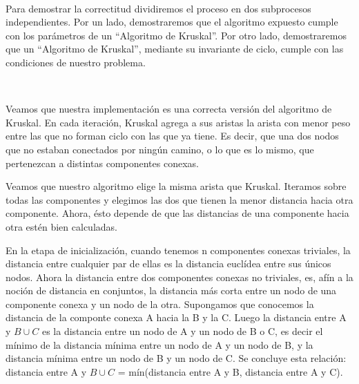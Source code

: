 \documentclass[11pt, a4paper, twoside]{article}
\begin{document}
{}

\begin{paragraph}\

Para demostrar la correctitud dividiremos el proceso en dos subprocesos
independientes. Por un lado, demostraremos que el algoritmo expuesto cumple
con los parámetros de un ``Algoritmo de Kruskal''. Por otro lado,
demostraremos que un ``Algoritmo de Kruskal'', mediante su invariante de
ciclo, cumple con las condiciones de nuestro problema.

\end{paragraph}

\begin{paragraph}\


Veamos que nuestra implementación es una correcta versión del algoritmo de
Kruskal. En cada iteración, Kruskal agrega a sus aristas la arista con menor
peso entre las que no forman ciclo con las que ya tiene. Es decir, que una dos
nodos que no estaban conectados por ningún camino, o lo que es lo mismo, que
pertenezcan a distintas componentes conexas.

Veamos que nuestro algoritmo elige la misma arista que Kruskal. Iteramos sobre
todas las componentes y elegimos las dos que tienen la menor distancia hacia
otra componente. Ahora, ésto depende de que las distancias de una componente hacia otra
estén bien calculadas.

En la etapa de inicialización, cuando tenemos n componentes conexas triviales,
la distancia entre cualquier par de ellas es la distancia euclídea entre sus
únicos nodos. Ahora la distancia entre dos componentes conexas no triviales,
es, afín a la noción de distancia en conjuntos, la distancia más corta entre
un nodo de una componente conexa y un nodo de la otra. Supongamos que
conocemos la distancia de la componte conexa A hacia la B y la C. Luego la
distancia entre A y $B \cup C$ es la distancia entre un nodo de A y un nodo de
B o C, es decir el mínimo de la distancia mínima entre un nodo de A y un nodo
de B, y la distancia mínima entre un nodo de B y un nodo de C. Se concluye
esta relación: distancia entre A y $B \cup C$ = mín(distancia entre A y B,
distancia entre A y C).

\end{paragraph}
\end{document}
